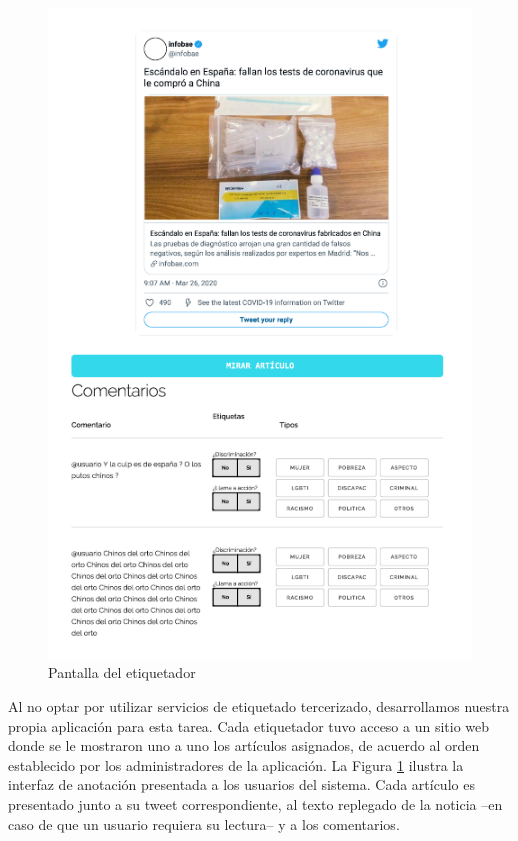 \begin{figure}
    \centering
    \includegraphics[width=\textwidth]{img/labeler.pdf}
    \caption{Pantalla del etiquetador}
    \label{fig:labeler_example}
\end{figure}

Al no optar por utilizar servicios de etiquetado tercerizado, desarrollamos nuestra propia aplicación para esta tarea. Cada etiquetador tuvo acceso a un sitio web donde se le mostraron uno a uno los artículos asignados, de acuerdo al orden establecido por los administradores de la aplicación. La Figura \ref{fig:labeler_example} ilustra la interfaz de anotación presentada a los usuarios del sistema. Cada artículo es presentado junto a su tweet correspondiente, al texto replegado de la noticia --en caso de que un usuario requiera su lectura-- y a los comentarios.


